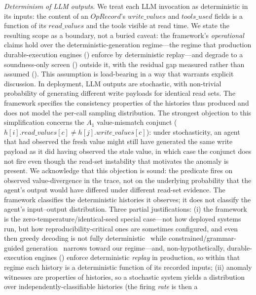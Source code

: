 \documentclass[journal,compsoc,10pt]{IEEEtran}
\providecommand{\citep}{\cite}
\theoremstyle{definition}
\theoremstyle{remark}
\newcommand{\fld}[1]{\mathit{#1}}
\begin{document}
\emph{Determinism of LLM outputs.}
We treat each LLM invocation as deterministic in its inputs: the
content of an $\fld{OpRecord}$'s $\fld{write\_values}$ and
$\fld{tools\_used}$ fields is a function of its $\fld{read\_values}$
and the tools visible at read time. We state the resulting scope as
a boundary, not a buried caveat: the framework's \emph{operational}
claims hold over the deterministic-generation regime---the regime that
production durable-execution engines () enforce
by deterministic replay---and degrade to a soundness-only screen
() outside it, with the
residual gap measured rather than assumed ().
This assumption is load-bearing
in a way that warrants explicit discussion. In deployment, LLM
outputs are stochastic, with non-trivial probability of generating
different write payloads for identical read sets. The framework
specifies the consistency properties of the histories thus
produced and does not model the per-call sampling distribution.
The strongest objection to this simplification concerns the
$A_1$ value-mismatch conjunct
($h[i].\fld{read\_values}[c] \neq h[j].\fld{write\_values}[c]$):
under stochasticity, an agent that had observed the fresh value
might still have generated the same write payload as it did
having observed the stale value, in which case the conjunct does
not fire even though the read-set instability that motivates the
anomaly is present. We acknowledge that this objection is sound:
the predicate fires on observed value-divergence in the trace,
not on the underlying probability that the agent's output would
have differed under different read-set evidence. The framework
classifies the deterministic histories it observes; it does not
classify the agent's input--output distribution. Three partial
justifications: (i) the framework is the zero-temperature/identical-seed
special case---not how deployed systems run, but how
reproducibility-critical ones are sometimes configured, and even then
greedy decoding is not fully
deterministic~\citep{SongEtAl2024Nondeterminism} while
constrained/grammar-guided generation~\citep{WillardLouf2023Outlines}
narrows toward our regime---and, non-hypothetically, durable-execution
engines () enforce deterministic \emph{replay}
in production, so within that regime each history is a deterministic
function of its recorded inputs; (ii) anomaly witnesses are properties of
histories, so a stochastic system yields a distribution over
independently-classifiable histories (the firing \emph{rate} is then a
\end{document}
